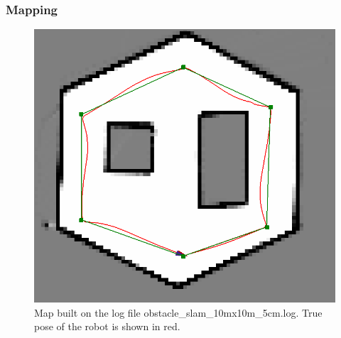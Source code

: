 \documentclass[journal]{IEEEtran}
\begin{document}
        \subsubsection{Mapping}
    \begin{figure}[b]
        \centering
        \includegraphics[width=1\linewidth]{obstacle_slam_10mx10m_5cm-map.png}
        \caption{Map built on the log file obstacle\_slam\_10mx10m\_5cm.log. True pose of the robot is shown in red.}
        \label{fig:map}
    \end{figure}
    
\end{document}

